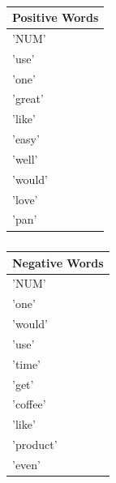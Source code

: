 \documentclass{llncs}
\begin{document}
\begin{center}
    \begin{table}
    \caption{Derived Word list post- stop words using 100 most frequent words (Kitchen - top 10)}
    \begin{minipage}{.5\linewidth}
    \caption{}
    \centering
    \begin{tabular}{| l |}
        \hline
        Positive Words \\ \hline
        'NUM' \\ \hline
        'use' \\ \hline
        'one' \\ \hline
        'great' \\ \hline
        'like' \\ \hline
        'easy' \\ \hline
        'well' \\ \hline
        'would' \\ \hline
        'love' \\ \hline
        'pan' \\ \hline
    \end{tabular}
    \end{minipage}%
    \begin{minipage}{.5\linewidth}
    \centering
    \caption{}
    \begin{tabular}{| l |}
        \hline
        Negative Words \\ \hline
        'NUM'\\ \hline
        'one'\\ \hline
        'would'\\ \hline
        'use'\\ \hline
        'time'\\ \hline
        'get'\\ \hline
        'coffee'\\ \hline
        'like'\\ \hline
        'product'\\ \hline
        'even'\\ \hline
    \end{tabular}
    \end{minipage} 
    \end{table}
\end{center}
\end{document}
